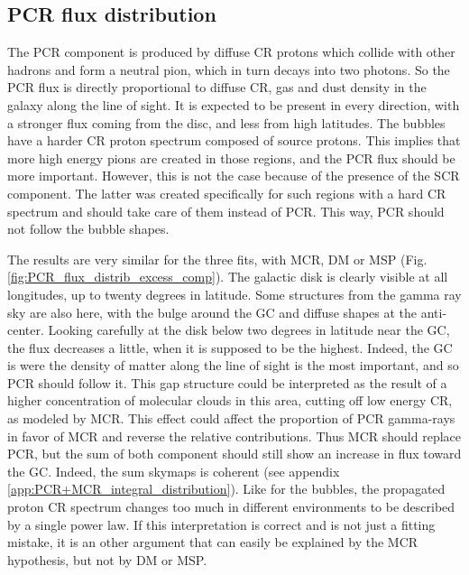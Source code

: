 \subsection{PCR flux distribution}
The PCR component is produced by diffuse CR protons which collide with other hadrons and form a neutral pion, which in turn decays into two photons. So the PCR flux is directly proportional to diffuse CR, gas and dust density in the galaxy along the line of sight. It is expected to be present in every direction, with a stronger flux coming from the disc, and less from high latitudes.
The bubbles have a harder CR proton spectrum composed of source protons. This implies that more high energy pions are created in those regions, and the PCR flux should be more important. However, this is not the case because of the presence of the SCR component. The latter was created specifically for such regions with a hard CR spectrum and should take care of them instead of PCR. This way, PCR should not follow the bubble shapes.

The results are very similar for the three fits, with MCR, DM or MSP (Fig. \ref{fig:PCR_flux_distrib_excess_comp}). The galactic disk is clearly visible at all longitudes, up to twenty degrees in latitude. Some structures from the gamma ray sky are also here, with the bulge around the GC and diffuse shapes at the anti-center.
Looking carefully at the disk below two degrees in latitude near the GC, the flux decreases a little, when it is supposed to be the highest. Indeed, the GC is were the density of matter along the line of sight is the most important, and so PCR should follow it. This gap structure could be interpreted as the result of a higher concentration of molecular clouds in this area, cutting off low energy CR, as modeled by MCR. This effect could affect the proportion of PCR gamma-rays in favor of MCR and reverse the relative contributions. Thus MCR should replace PCR, but the sum of both component should still show an increase in flux toward the GC. Indeed, the sum skymaps is coherent (see appendix \ref{app:PCR+MCR_integral_distribution}). Like for the bubbles, the propagated proton CR spectrum changes too much in different environments to be described by a single power law. If this interpretation is correct and is not just a fitting mistake, it is an other argument that can easily be explained by the MCR hypothesis, but not by DM or MSP.


